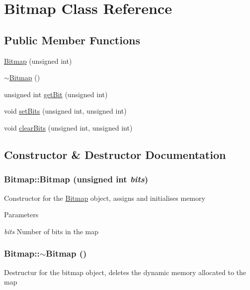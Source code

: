 \hypertarget{classBitmap}{
\section{Bitmap Class Reference}
\label{classBitmap}
}
\subsection*{Public Member Functions}
\begin{DoxyCompactItemize}
\item 
\hyperlink{classBitmap_ac625c8d96a68956f1b879eea3e94a7da}{Bitmap} (unsigned int)
\item 
\hyperlink{classBitmap_a72d2a301ec1eb1c8d0f3d64823659a8e}{$\sim$Bitmap} ()
\item 
unsigned int \hyperlink{classBitmap_afcb1fce13a738274db91109b7afa86e7}{getBit} (unsigned int)
\item 
void \hyperlink{classBitmap_a499f1680d78307b7663e9671847dd87c}{setBits} (unsigned int, unsigned int)
\item 
void \hyperlink{classBitmap_ac81a92cbbdb42ced42dd649f6e8260df}{clearBits} (unsigned int, unsigned int)
\end{DoxyCompactItemize}


\subsection{Constructor \& Destructor Documentation}
\hypertarget{classBitmap_ac625c8d96a68956f1b879eea3e94a7da}{
\subsubsection[{Bitmap}]{\setlength{\rightskip}{0pt plus 5cm}Bitmap::Bitmap (unsigned int {\em bits})}}
\label{classBitmap_ac625c8d96a68956f1b879eea3e94a7da}
Constructor for the \hyperlink{classBitmap}{Bitmap} object, assigns and initialises memory


\begin{DoxyParams}{Parameters}
\item[{\em bits}]Number of bits in the map \end{DoxyParams}
\hypertarget{classBitmap_a72d2a301ec1eb1c8d0f3d64823659a8e}{
\subsubsection[{$\sim$Bitmap}]{\setlength{\rightskip}{0pt plus 5cm}Bitmap::$\sim$Bitmap ()}}
\label{classBitmap_a72d2a301ec1eb1c8d0f3d64823659a8e}
Destructur for the bitmap object, deletes the dynamic memory allocated to the map 

